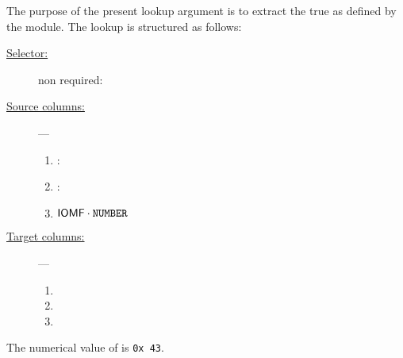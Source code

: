 The purpose of the present lookup argument is to extract the true  as defined by the \btcMod{} module.
The lookup is structured as follows:
\begin{description}
	\item[\underline{Selector:}] non required:
	\item[\underline{Source columns:}] ---
		\begin{multicols}{3}
			\begin{enumerate}
				\item \relBlock{}: 
				\item \absBlock{}:
				\item $\textsf{IOMF} \cdot \texttt{NUMBER}$
			\end{enumerate}
		\end{multicols}
	\item[\underline{Target columns:}] ---
		\begin{multicols}{3}
			\begin{enumerate}
				\item \relBlock{}
				\item \blockDataLo{}
				\item \INST{}
			\end{enumerate}
		\end{multicols}
\end{description}
\saNote{}
The numerical value of  is \texttt{0x\,43}.
